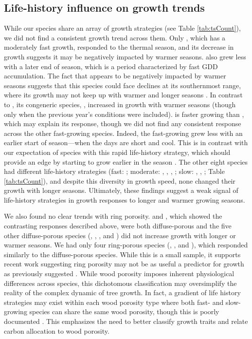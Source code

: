 \documentclass{article}\usepackage[]{graphicx}\usepackage[]{xcolor}
\begin{document}
\subsection{Life-history influence on growth trends}
While our species share an array of growth strategies (see Table \ref{tab:tsCount}), we did not find a consistent growth trend across them. Only {\Ball}, which has a moderately fast growth, responded to the thermal season, and its decrease in growth suggests it may be negatively impacted by warmer seasons. {\Ball} also grew less with a later end of season, which is a period characterized by fast GDD accumulation. The fact that {\Ball} appears to be negatively impacted by warmer seasons suggests that this species could face declines at its southernmost range, where its growth may not keep up with warmer and longer seasons \citep{doak_demographic_2010,aitken_adaptation_2008}. In contrast to {\Ball}, its congeneric species, {\Bnig}, increased in growth with warmer seasons (though only when the previous year's conditions were included). {\Bnig} is faster growing than {\Ball}, which may explain its response, though we did not find any consistent response across the other fast-growing species. Indeed, the fast-growing {\Tame} \citep[Table \ref{tab:tsCount};][]{burns_silvics_1990} grew less with an earlier start of season---when the days are short and cool. This is in contrast with our expectation of species with this rapid life-history strategy, which should provide an edge by starting to grow earlier in the season \citep{loughnan_budburst_2025}. The other eight species had different life-history strategies (fast: {\Pdel}; moderate: {\Arub}, {\Afla}, {\Cova}, {\Qrub}; slow: {\Asac}, {\Cgla}, {\Qalb}; Table \ref{tab:tsCount}), and despite this diversity in growth speed, none changed their growth with longer seasons. Ultimately, these findings suggest a weak signal of life-history strategies in growth responses to longer and warmer growing seasons.

We also found no clear trends with ring porosity. {\Ball} and {\Bnig}, which showed the contrasting responses described above, were both diffuse-porous and the five other diffuse-porous species ({\Afla}, {\Arub}, {\Asac}, {\Pdel} and {\Tame}) did not increase growth with longer or warmer seasons. We had only four ring-porous species ({\Cgla}, {\Cova}, {\Qalb} and {\Qrub}), which responded similarly to the diffuse-porous species. While this is a small sample, it supports recent work \citep[e.g.,][]{grover_growth_2023} suggesting ring porosity may not be as useful a predictor for growth as previously suggested \citep{wang_relation_1992}. While wood porosity imposes inherent physiological differences across species, this dichotomous classification may oversimplify the reality of the complex dynamic of tree growth. In fact, a gradient of life history strategies may exist within each wood porosity type where both fast- and slow-growing species can share the same wood porosity, though this is poorly documented \citep{taneda_casestudy_2008}. This emphasizes the need to better classify growth traits and relate carbon allocation to wood porosity. 
\end{document}
